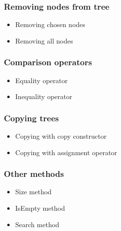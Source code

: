 \documentclass{article}
\begin{document}
\subsubsection*{Removing nodes from tree}

\begin{itemize}
    \item Removing chosen nodes
    \item Removing all nodes
\end{itemize}

\subsubsection*{Comparison operators}

\begin{itemize}
    \item Equality operator
    \item Inequality operator
\end{itemize}

\subsubsection*{Copying trees}

\begin{itemize}
    \item Copying with copy constructor
    \item Copying with assignment operator
\end{itemize}

\subsubsection*{Other methods}

\begin{itemize}
    \item Size method
    \item IsEmpty method
    \item Search method
\end{itemize}
\end{document}
